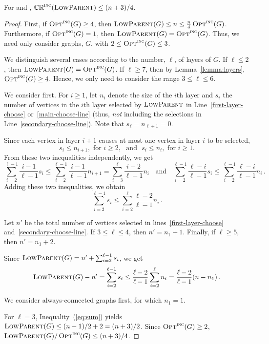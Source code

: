 \begin{theorem}
\label{thm:upperdscds}
For \ds and \cds,
$\mathbb{CR}^{\textsc{\ensuremath{\text{inc}}}}(\operatorname{\textsc{LowParent}}) \leq (n+3)/4$.
\end{theorem}
\begin{proof}
First, if $\operatorname{\textsc{Opt}}^\textsc{\ensuremath{\text{inc}}}(G) \geq 4$, then $\operatorname{\textsc{LowParent}}(G) \leq n
\leq \frac{n}{4} \operatorname{\textsc{Opt}}^\textsc{\ensuremath{\text{inc}}}(G)$.
Furthermore, if $\operatorname{\textsc{Opt}}^\textsc{\ensuremath{\text{inc}}}(G) = 1$, then $\operatorname{\textsc{LowParent}}(G) = \operatorname{\textsc{Opt}}^\textsc{\ensuremath{\text{inc}}}(G)$.
Thus, we need only consider graphs, $G$, with $2 \leq \operatorname{\textsc{Opt}}^\textsc{\ensuremath{\text{inc}}}(G) \leq 3$.

We distinguish several cases according to the 
number, $\ell$, of layers of $G$.
If $\ell \leq 2$, then $\operatorname{\textsc{LowParent}}(G) = \operatorname{\textsc{Opt}}^\textsc{\ensuremath{\text{inc}}}(G)$.
If $\ell \geq 7$, then by Lemma~\ref{lemma:layers}, $\operatorname{\textsc{Opt}}^\textsc{\ensuremath{\text{inc}}}(G) \geq 4$.
Hence, we only need to consider the range $3 \leq \ell \leq 6$.


We consider \ds first.
For $i \geq 1$, let $n_i$ denote the size of the $i$th layer
and $s_i$ the number of vertices in the $i$th layer
selected by $\operatorname{\textsc{LowParent}}$ in Line~\ref{first-layer-choose}
or~\ref{main-choose-line}
(thus, \emph{not} including the selections in Line~\ref{secondary-choose-line}).
Note that $s_{\ell}=n_{\ell+1}=0$.

Since each vertex in layer $i+1$ causes
at most one vertex in layer $i$ to be selected,
\[
s_i \le n_{i+1}, \text{ for } i \geq 2, 
\mbox{~~and~~}
s_i \le n_i, \text{ for } i \geq 1.
\]
From these two inequalities independently, we get
\[
\sum_{i=2}^{\ell-1} \frac{i-1}{\ell-1}s_i \leq 
\sum_{i=2}^{\ell-1} \frac{i-1}{\ell-1}n_{i+1} =
 \sum_{i=3}^{\ell} \frac{i-2}{\ell-1}n_{i}
\;\; \text{ and } \;\;
\sum_{i=2}^{\ell-1} \frac{\ell-i}{\ell-1}s_i \leq \sum_{i=2}^{\ell-1} \frac{\ell-i}{\ell-1}n_{i}\,.
\]
Adding these two inequalities, we obtain
$$\sum_{i=2}^{\ell-1} s_i \leq \sum_{i=2}^{\ell}\frac{\ell-2}{\ell-1}n_i\,.$$

Let $n'$ be the total number of vertices selected in
lines~\ref{first-layer-choose} and~\ref{secondary-choose-line}.
If $3 \leq \ell \leq 4$, then $n'=n_1+1$.
Finally, if $\ell \geq 5$, then $n'=n_1+2$.

Since $\operatorname{\textsc{LowParent}}(G) = n' + \sum_{i=2}^{\ell-1} s_i$, we get
\begin{equation}
\label{eq:sum}
\operatorname{\textsc{LowParent}}(G)-n'
=  \sum_{i=2}^{\ell-1} s_i
\leq \frac{\ell-2}{\ell-1}\sum_{i=2}^{\ell}n_i
= \frac{\ell-2}{\ell-1}(n - n_1)\,.
\end{equation}

We consider always-connected graphs first, for which $n_1=1$. 

For $\ell=3$, Inequality~(\ref{eq:sum}) yields $\operatorname{\textsc{LowParent}}(G)\leq
(n-1)/2+2 = (n+3)/2$.
Since $\operatorname{\textsc{Opt}}^\textsc{\ensuremath{\text{inc}}}(G) \geq 2$, $\operatorname{\textsc{LowParent}}(G) / \operatorname{\textsc{Opt}}^\textsc{\ensuremath{\text{inc}}}(G) \leq (n+3)/4 $. 


\end{proof}
